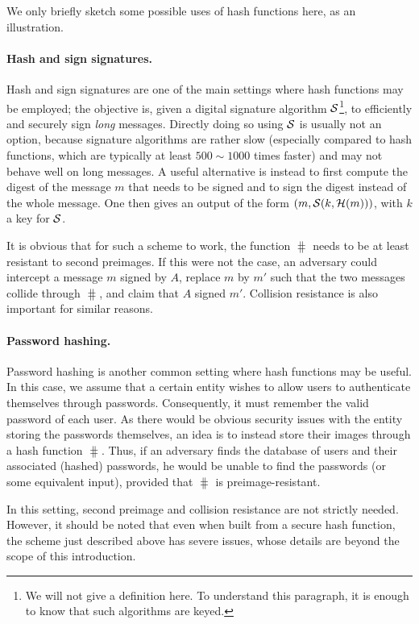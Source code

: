 We only briefly sketch some possible uses of hash functions here, as an illustration.

\paragraph{Hash and sign signatures.} Hash and sign signatures are one of the main settings where hash functions may be employed; the objective is, given a digital signature
algorithm $\operatorname{\mathcal{S}}$\footnote{We will not give a definition here. To understand this paragraph, it is enough to know that such algorithms are keyed.}, to efficiently and securely sign \emph{long} messages. Directly doing so using $\operatorname{\mathcal{S}}$ is usually not an option, because signature algorithms are rather slow (especially compared
to hash functions, which are typically at least $500 \sim 1000$ times faster) and may not behave well on long messages. A useful alternative is instead to first compute the digest of the
message $m$ that needs to be signed and to sign the digest instead of the whole message. One then gives an output of the form $(m, \operatorname{\mathcal{S}}(k,\operatorname{\mathcal{H}}(m)))$, with $k$ a key for $\operatorname{\mathcal{S}}$. 

It is obvious that for such a scheme to work, the function $\hash$ needs to be at least resistant to second preimages. If this were not the case, an adversary could intercept a message $m$
signed by $A$, replace $m$ by $m'$ such that the two messages collide through $\hash$, and claim that $A$ signed $m'$.
Collision resistance is also important for similar reasons.

\paragraph{Password hashing.} Password hashing is another common setting where hash functions may be useful. In this case, we assume that a certain entity wishes to allow users to authenticate themselves
through passwords. Consequently, it must remember the valid password of each user. As there would be obvious security issues with the entity storing the passwords themselves, an idea
is to instead store their images through a hash function $\hash$. Thus, if an adversary finds the database of users and their associated (hashed) passwords, he would be unable to find
the passwords (or some equivalent input), provided that $\hash$ is preimage-resistant.

In this setting, second preimage and collision resistance are not strictly needed. However, it should be noted that even when built from a secure hash function,
the scheme just described above has severe issues, whose details are beyond the scope of this introduction.

